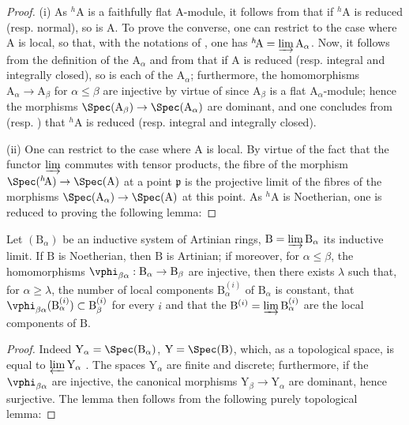 \begin{proof}
(i) As ${}^h\!\mathrm{A}$ is a faithfully flat A-module, it follows from  that if ${}^h\!\mathrm{A}$ is reduced (resp. normal), so is A.
To prove the converse, one can restrict to the case where A is local, so that, with the notations of , one has ${}^h\!\mathrm{A}=\varinjlim\mathrm{A}_\alpha$.
Now, it follows from the definition of the $\mathrm{A}_\alpha$ and from  that if A is reduced (resp. integral and integrally closed), so is each of the $\mathrm{A}_\alpha$;
furthermore, the homomorphisms $\mathrm{A}_\alpha\to\mathrm{A}_\beta$ for $\alpha\leq\beta$ are injective by virtue of  since $\mathrm{A}_\beta$ is a flat $\mathrm{A}_\alpha$-module;
hence the morphisms $\Spec(\mathrm{A}_\beta)\to\Spec(\mathrm{A}_\alpha)$ are dominant, and one concludes from  (resp. ) that ${}^h\!\mathrm{A}$ is reduced (resp. integral and integrally closed).

(ii) One can restrict to the case where A is local.
By virtue of the fact that the functor $\varinjlim$ commutes with tensor products, the fibre of the morphism $\Spec({}^h\!\mathrm{A})\to\Spec(\mathrm{A})$ at a point $\mathfrak{p}$ is the projective limit of the fibres of the morphisms $\Spec(\mathrm{A}_\alpha)\to\Spec(\mathrm{A})$ at this point.
As ${}^h\!\mathrm{A}$ is Noetherian, one is reduced to proving the following lemma:
\end{proof}

\begin{lemma}[18.6.9.1]
\label{IV.18.6.9.1}
Let $(\mathrm{B}_\alpha)$ be an inductive system of Artinian rings, $\mathrm{B}=\varinjlim\mathrm{B}_\alpha$ its inductive limit.
If $\mathrm{B}$ is Noetherian, then $\mathrm{B}$ is Artinian;
if moreover, for $\alpha\leq\beta$, the homomorphisms $\vphi_{\beta\alpha}:\mathrm{B}_\alpha\to\mathrm{B}_\beta$ are injective, then there exists $\lambda$ such that, for $\alpha\geq\lambda$, the number of local components $\mathrm{B}_\alpha^{(i)}$ of $\mathrm{B}_\alpha$ is constant, that $\vphi_{\beta\alpha}(\mathrm{B}_\alpha^{(i)})\subset\mathrm{B}_\beta^{(i)}$ for every $i$ and that the $\mathrm{B}^{(i)}=\varinjlim\mathrm{B}_\alpha^{(i)}$ are the local components of $\mathrm{B}$.
\end{lemma}

\begin{proof}
Indeed $\mathrm{Y}_\alpha=\Spec(\mathrm{B}_\alpha)$, $\mathrm{Y}=\Spec(\mathrm{B})$, which, as a topological space, is equal to $\varprojlim\mathrm{Y}_\alpha$ .
The spaces $\mathrm{Y}_\alpha$ are finite and discrete;
furthermore, if the $\vphi_{\beta\alpha}$ are injective, the canonical morphisms $\mathrm{Y}_\beta\to\mathrm{Y}_\alpha$ are dominant, hence surjective.
The lemma then follows from the following purely topological lemma:
\end{proof}

